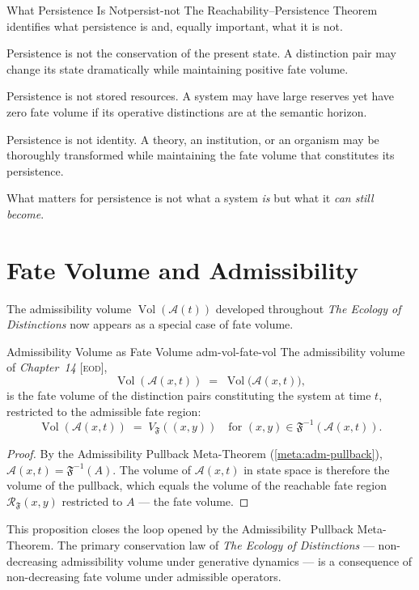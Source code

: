 \documentclass[12pt,twoside,openright]{book}
\newcommand{\adm}{\mathcal{A}}            %
\newcommand{\Vol}{\operatorname{Vol}}     %
\newcommand{\fateMap}{\mathfrak{F}}
\newcommand{\EOD}[1]{\textit{#1} [\textsc{eod}]}
\newcommand{\admRegion}{A}
\providecommand{\admRegion}{A}
\providecommand{\fateReach}[1]{\mathcal{R}_{\fateMap}(#1)}
\providecommand{\fateVol}[1]{V_{\fateMap}(#1)}
\begin{document}
\begin{remark}{What Persistence Is Not}{persist-not}
The Reachability--Persistence Theorem identifies what
persistence is and, equally important, what it is not.

Persistence is not the conservation of the present state.
A distinction pair may change its state dramatically while
maintaining positive fate volume.

Persistence is not stored resources. A system may have large
reserves yet have zero fate volume if its operative distinctions
are at the semantic horizon.

Persistence is not identity. A theory, an institution, or an
organism may be thoroughly transformed while maintaining the
fate volume that constitutes its persistence.

What matters for persistence is not what a system \emph{is}
but what it \emph{can still become}.
\end{remark}

\section{Fate Volume and Admissibility}

The admissibility volume $\Vol(\adm(t))$ developed throughout
\textit{The Ecology of Distinctions} now appears as a special
case of fate volume.

\begin{proposition}{Admissibility Volume as Fate Volume}%
  {adm-vol-fate-vol}
The admissibility volume of \EOD{Chapter~14},
\[
  \Vol(\adm(x,t))
  \;=\;
  \Vol\bigl(\mathcal{A}(x,t)\bigr),
\]
is the fate volume of the distinction pairs constituting the
system at time $t$, restricted to the admissible fate region:
\[
  \Vol(\adm(x,t))
  \;=\;
  \fateVol{(x,y)}
  \quad\text{for }(x,y)\in\fateMap^{-1}(\adm(x,t)).
\]
\begin{proof}
By the Admissibility Pullback Meta-Theorem
(\cref{meta:adm-pullback}), $\adm(x,t)=\fateMap^{-1}(\admRegion)$.
The volume of $\adm(x,t)$ in state space is therefore the
volume of the pullback, which equals the volume of the
reachable fate region $\fateReach{x,y}$ restricted to
$\admRegion$ --- the fate volume.
\end{proof}
\end{proposition}

This proposition closes the loop opened by the Admissibility
Pullback Meta-Theorem. The primary conservation law of
\textit{The Ecology of Distinctions} --- non-decreasing
admissibility volume under generative dynamics --- is a
consequence of non-decreasing fate volume under admissible
operators.
\end{document}
